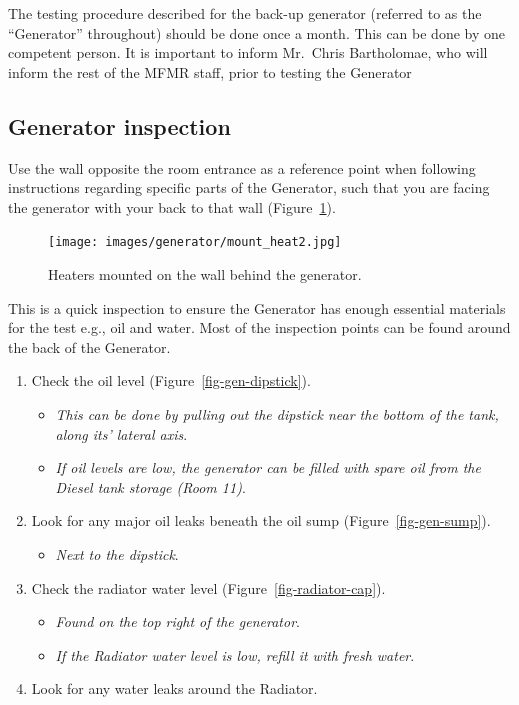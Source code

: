 \documentclass[
  12pt,
]{report}
\providecommand{\tightlist}{%
  \setlength{\itemsep}{0pt}\setlength{\parskip}{0pt}}\usepackage{longtable,booktabs,array}
\begin{document}
{The testing procedure described for the back-up generator (referred to
as the ``Generator'' throughout) should be done once a month}. {This can
be done by one competent person}. {It is important to inform Mr.~Chris
Bartholomae, who will inform the rest of the MFMR staff, prior to
testing the Generator}

\hypertarget{sec-gen-inspect}{%
\subsection{Generator inspection}\label{sec-gen-inspect}}

{Use the wall opposite the room entrance as a reference point when
following instructions regarding specific parts of the Generator, such
that you are facing the generator with your back to that wall}
(Figure~\ref{fig-mount-heat}).

\begin{figure}[H]

{\centering \texttt{[image: images/generator/mount\_heat2.jpg]}

}

\caption{\label{fig-mount-heat}Heaters mounted on the wall behind the
generator.}

\end{figure}

This is a quick inspection to ensure the Generator has enough essential
materials for the test e.g., oil and water. Most of the inspection
points can be found around the back of the Generator.

\begin{enumerate}
\def\labelenumi{\arabic{enumi}.}
\tightlist
\item
  Check the oil level (Figure~\ref{fig-gen-dipstick}).

  \begin{itemize}
  \tightlist
  \item
    \emph{This can be done by pulling out the dipstick near the bottom
    of the tank, along its' lateral axis}.
  \item
    \emph{If oil levels are low, the generator can be filled with spare
    oil from the Diesel tank storage (Room 11)}.
  \end{itemize}
\item
  Look for any major oil leaks beneath the oil sump
  (Figure~\ref{fig-gen-sump}).

  \begin{itemize}
  \tightlist
  \item
    \emph{Next to the dipstick}.
  \end{itemize}
\item
  Check the radiator water level (Figure~\ref{fig-radiator-cap}).

  \begin{itemize}
  \tightlist
  \item
    \emph{Found on the top right of the generator}.
  \item
    \emph{If the Radiator water level is low, refill it with fresh
    water}.
  \end{itemize}
\item
  Look for any water leaks around the Radiator.
\end{enumerate}
\end{document}
